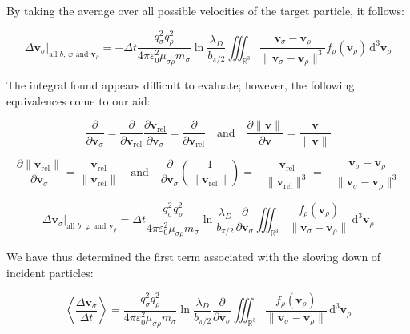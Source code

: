 By taking the average over all possible velocities of the target particle, it follows:

\begin{equation}
    \Delta\mathbf{v}_\sigma \Bigr|_{\text{all }b\text{, }\varphi\text{ and }\mathbf{v}_\rho }=-\Delta t\frac{q_\sigma ^2q_\rho ^2}{4\pi\varepsilon_0^2\mu_{\sigma\rho} m_\sigma }\ln{\frac{\lambda_D}{b_{\pi/2}}}\iiint_{\mathbb{R}^3}\frac{\mathbf{v}_\sigma -\mathbf{v}_\rho }{\|\mathbf{v}_\sigma -\mathbf{v}_\rho \|^3}f_\rho (\mathbf{v}_\rho )\,\mathrm{d}^3\mathbf{v}_\rho 
\end{equation}

The integral found appears difficult to evaluate; however, the following equivalences come to our aid:

\begin{equation}
    \frac{\partial}{\partial\mathbf{v}_\sigma }=\frac{\partial}{\partial\mathbf{v}_\text{rel}}\frac{\partial\mathbf{v}_\text{rel}}{\partial\mathbf{v}_\sigma }=\frac{\partial}{\partial\mathbf{v}_\text{rel}}\quad\text{and}\quad\frac{\partial\|\mathbf{v}\|}{\partial\mathbf{v}}=\frac{\mathbf{v}}{\|\mathbf{v}\|}
\end{equation}

\begin{equation}
    \frac{\partial\|\mathbf{v}_\text{rel}\|}{\partial\mathbf{v}_\sigma }=\frac{\mathbf{v}_\text{rel}}{\|\mathbf{v}_\text{rel}\|}\quad\text{and}\quad\frac{\partial}{\partial\mathbf{v}_\sigma }\left(\frac{1}{\|\mathbf{v}_\text{rel}\|}\right)=-\frac{\mathbf{v}_\text{rel}}{\|\mathbf{v}_\text{rel}\|^3}=-\frac{\mathbf{v}_\sigma -\mathbf{v}_\rho }{\|\mathbf{v}_\sigma -\mathbf{v}_\rho \|^3}
\end{equation}

\begin{equation}
    \Delta\mathbf{v}_\sigma \Bigr|_{\text{all }b\text{, }\varphi\text{ and }\mathbf{v}_\rho }=\Delta t\frac{q_\sigma ^2q_\rho ^2}{4\pi\varepsilon_0^2\mu_{\sigma\rho} m_\sigma }\ln{\frac{\lambda_D}{b_{\pi/2}}}\frac{\partial}{\partial\mathbf{v}_\sigma }\iiint_{\mathbb{R}^3}\frac{f_\rho (\mathbf{v}_\rho )}{\|\mathbf{v}_\sigma -\mathbf{v}_\rho \|}\,\mathrm{d}^3\mathbf{v}_\rho 
\end{equation}

We have thus determined the first term associated with the slowing down of incident particles:

\begin{equation}
    \left\langle\frac{\Delta\mathbf{v}_\sigma}{\Delta t}\right\rangle=\frac{q_\sigma ^2q_\rho ^2}{4\pi\varepsilon_0^2\mu_{\sigma\rho} m_\sigma }\ln{\frac{\lambda_D}{b_{\pi/2}}}\frac{\partial}{\partial\mathbf{v}_\sigma}\iiint_{\mathbb{R}^3}\frac{f_\rho(\mathbf{v}_\rho)}{\|\mathbf{v}_\sigma-\mathbf{v}_\rho\|}\,\mathrm{d}^3\mathbf{v}_\rho
\end{equation}

